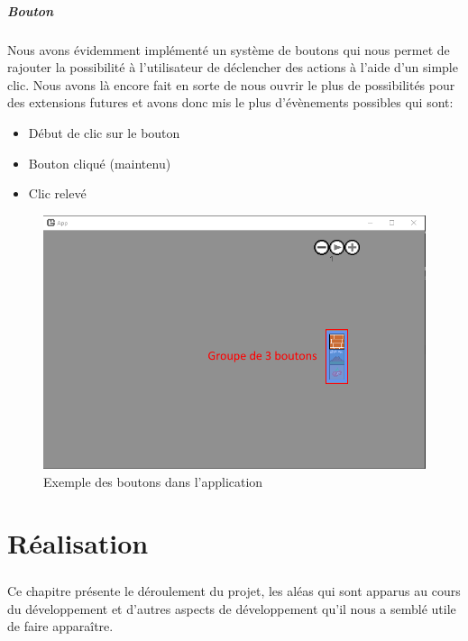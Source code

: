 \documentclass{EPUProjetDi}
\begin{document}
\paragraph{Bouton}

Nous avons évidemment implémenté un système de boutons qui nous permet de rajouter la possibilité à l'utilisateur de déclencher des actions à l'aide d'un 
simple clic. Nous avons là encore fait en sorte de nous ouvrir le plus de possibilités pour des extensions futures et avons donc mis le plus d'évènements 
possibles qui sont:
\begin{itemize}
    \item Début de clic sur le bouton
    \item Bouton cliqué (maintenu)
    \item Clic relevé
\end{itemize}

\begin{figure}[h]
    \centering
    \includegraphics[scale=0.5]{button.png}
    \caption{Exemple des boutons dans l'application}
    \label{fig:button_example}
\end{figure}

\chapter{Réalisation}

\paragraph{}
Ce chapitre présente le déroulement du projet, les aléas qui sont apparus au cours du 
développement et d'autres aspects de développement qu'il nous a semblé 
utile de faire apparaître.
\end{document}
